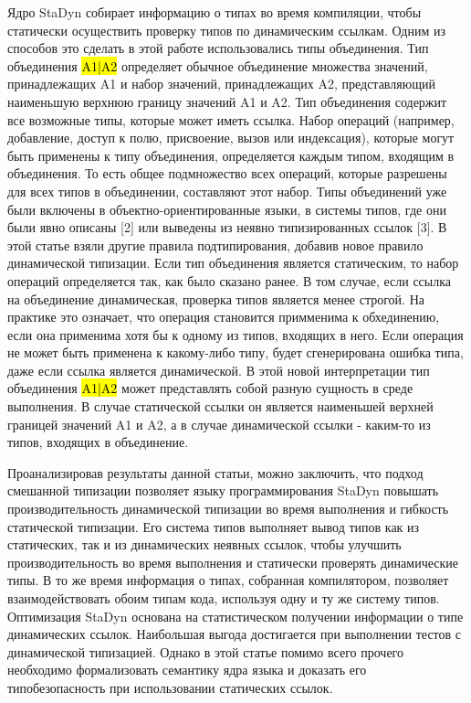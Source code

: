 Ядро StaDyn собирает информацию о типах во время компиляции, чтобы статически осуществить проверку типов по
динамическим ссылкам.
Одним из способов это сделать в этой работе использовались типы объединения.
Тип объединения \hl{A1|A2} определяет обычное объединение множества значений, принадлежащих A1 и набор значений,
принадлежащих A2, представляющий наименьшую верхнюю границу значений A1 и A2.
Тип объединения содержит все возможные типы, которые может иметь ссылка.
Набор операций (например, добавление, доступ к полю, присвоение, вызов или индексация), которые могут быть применены к
типу объединения, определяется каждым типом, входящим в объединения.
То есть общее подмножество всех операций, которые разрешены для всех типов в объединении, составляют этот набор.
Типы объединений уже были включены в объектно-ориентированные языки, в системы типов, где они были явно описаны
[2] или выведены из неявно типизированных ссылок [3].
В этой статье взяли другие правила подтипирования, добавив новое правило динамической типизации.
Если тип объединения является статическим, то набор операций определяется так, как было сказано ранее.
В том случае, если ссылка на объединение динамическая, проверка типов является менее строгой.
На практике это означает, что операция становится примменима к обхединению, если она применима хотя бы к одному
из типов, входящих в него.
Если операция не может быть применена к какому-либо типу, будет сгенерирована ошибка типа, даже если ссылка является
динамической.
В этой новой интерпретации тип объединения \hl{A1|A2} может представлять собой разную сущность в среде выполнения.
В случае статической ссылки он является наименьшей верхней границей значений A1 и A2, а в случае динамической ссылки
- каким-то из типов, входящих в объединение.

Проанализировав результаты данной статьи, можно заключить, что подход смешанной типизации позволяет языку программирования
StaDyn повышать производительность динамической типизации во время выполнения и гибкость статической типизации.
Его система типов выполняет вывод типов как из статических, так и из динамических неявных ссылок, чтобы улучшить
производительность во время выполнения и статически проверять динамические типы.
В то же время информация о типах, собранная компилятором, позволяет взаимодействовать обоим типам кода, используя
одну и ту же систему типов.
Оптимизация StaDyn основана на статистическом получении информации о типе динамических ссылок.
Наибольшая выгода достигается при выполнении тестов с динамической типизацией.
Однако в этой статье помимо всего прочего необходимо формализовать семантику ядра языка и доказать его
типобезопасность при использовании статических ссылок.


